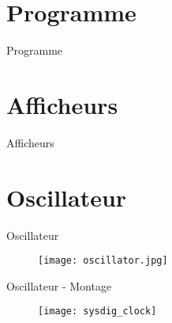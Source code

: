 \documentclass{beamer}
\begin{document}
\section{Programme}
\begin{frame}{Programme}
	
\end{frame}


\section{Afficheurs}
\begin{frame}{Afficheurs}
	
\end{frame}


\section{Oscillateur}
\begin{frame}{Oscillateur}
	\begin{figure}
		\centering
		\texttt{[image: oscillator.jpg]}
	\end{figure}
\end{frame}

\begin{frame}{Oscillateur - Montage}
	\begin{figure}
		\centering
		\texttt{[image: sysdig\_clock]}
	\end{figure}
\end{frame}




\end{document}
